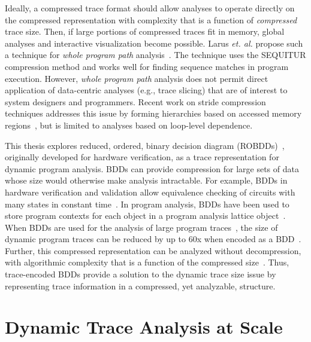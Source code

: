 \documentclass[defaultstyle,11pt]{thesis}
\begin{document}
Ideally, a compressed trace format should allow analyses to operate
directly on the compressed representation with complexity that is a
function of \textit{compressed} trace size.  Then, if large portions
of compressed traces fit in memory, global analyses and interactive
visualization become possible.  Larus \textit{et. al.} propose such a
technique for \textit{whole program path}
analysis~\cite{larus:99:pldi}.  The technique uses the SEQUITUR
compression method and works well for finding sequence matches in
program execution.  However, \textit{whole program path} analysis does
not permit direct application of data-centric analyses (e.g., trace
slicing) that are of interest to system designers and programmers.
Recent work on stride compression techniques addresses this issue by
forming hierarchies based on accessed memory
regions~\cite{minjang:10:micro}, but is limited to analyses based on
loop-level dependence.

This thesis explores reduced, ordered, binary decision diagram
(ROBDDs)~\cite{bryant:86:ieeetc}, originally developed for hardware
verification, as a trace representation for dynamic program analysis.
BDDs can provide compression for large sets of data whose size would
otherwise make analysis intractable.  For example, BDDs in hardware
verification and validation allow equivalence checking of circuits
with many states in constant time~\cite{brayton:96:cav}.  In program
analysis, BDDs have been used to store program contexts for each
object in a program analysis lattice object~\cite{whaley:07:thesis}.
When BDDs are used for the analysis of large program
traces~\cite{price:06:cal,price:08:pact,zhang:04:icse}, the size of
dynamic program traces can be reduced by up to 60x when encoded as a
BDD~\cite{price:06:cal}.  Further, this compressed representation can
be analyzed without decompression, with algorithmic complexity that is
a function of the compressed size~\cite{price:06:cal}.  Thus,
trace-encoded BDDs provide a solution to the dynamic trace size issue
by representing trace information in a compressed, yet analyzable,
structure.

\section{Dynamic Trace Analysis at Scale}
\end{document}
